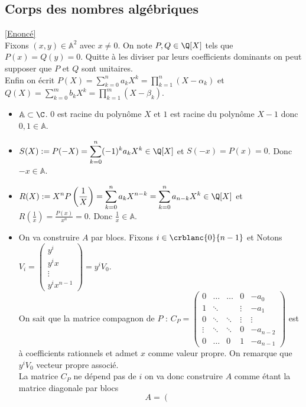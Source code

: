 \documentclass[8pt]{book}
\begin{document}
	\subsection{Corps des nombres algébriques }
	\label{Corps des nombres algébriques corrigé}
	\textcolor{blue}{\hyperref[Corps des nombres algébriques]{[Enoncé]}}\\
	Fixons $(x,y)\in \mathbb A^2$ avec $x\ne 0$. On note $P,Q\in \Q[X]$ tels que $P(x)=Q(y)=0$. Quitte à les diviser par leurs coefficients dominants on peut supposer que $P$ et $Q$ sont unitaires.\\
	Enfin on écrit $P(X)=\displaystyle\sum_{k=0}^na_kX^k=\prod_{k=1}^n(X-\alpha_k)$ et $Q(X)=\displaystyle\sum_{k=0}^mb_kX^k=\prod_{k=1}^m(X-\beta_k)$.
	\begin{itemize}
		\item $\mathbb A\subset \C$. $0$ est racine du polynôme $X$ et $1$ est racine du polynôme $X-1$ donc $0,1\in \mathbb A$.
		\item $S(X):=P(-X)=\displaystyle\sum_{k=0}^n(-1)^ka_kX^k\in \Q[X]$ et $S(-x)=P(x)=0$. Donc $-x\in \mathbb A$.
		\item $R(X):=\displaystyle X^nP\left(\frac{1}{X}\right)=\sum_{k=0}^na_kX^{n-k}=\sum_{k=0}^na_{n-k}X^k\in \Q[X]$ et $\displaystyle R\left(\frac{1}{x}\right)=\frac{P(x)}{x^n}=0$. Donc $\displaystyle\frac{1}{x}\in \mathbb A$.
		\item On va construire $A$ par blocs. Fixons $i\in \crblanc{0}{n-1}$ et Notons $V_i=\begin{pmatrix}y^i\\y^ix\\\vdots\\y^ix^{n-1}\end{pmatrix}=y^iV_0$.\\
		On sait que la matrice compagnon de $P$ : $C_P=
		\begin{pmatrix}
			0&\dots&\dots&0&-a_0\\
			1&\ddots&\ &\vdots&-a_1\\
			0&\ddots&\ddots&\vdots&\vdots\\
			\vdots&\ddots&\ddots&0&-a_{n-2}\\
			0&\dots&0&1&-a_{n-1}
		\end{pmatrix}$ est à coefficients rationnels et admet $x$ comme valeur propre. On remarque que $y^iV_0$ vecteur propre associé.\\
		La matrice $C_P$ ne dépend pas de $i$ on va donc construire $A$ comme étant la matrice diagonale par blocs $$A=
		\left(\begin{array}{c|c|c|c}

\end{array}$$
\end{itemize}
\end{document}
